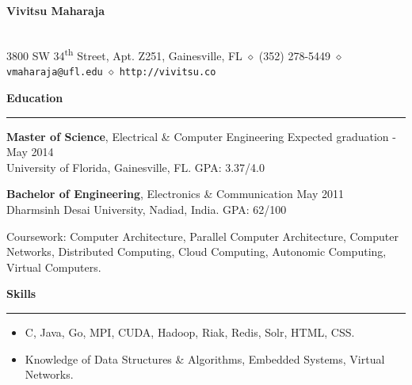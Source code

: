 \documentclass[10pt]{article}
\begin{document}
\begin{center}
\textbf{\Large Vivitsu Maharaja}
\date{}
\thispagestyle{empty}
\smallskip \\
3800 SW 34\textsuperscript{th} Street, Apt. Z251, Gainesville, FL $\diamond$ (352) 278-5449 $\diamond$ \texttt{vmaharaja@ufl.edu} $\diamond$ \texttt{http://vivitsu.co}
\end{center}


\textbf{Education}
\smallskip
\hrule
{\bf Master of Science}, Electrical \& Computer Engineering \hfill Expected graduation - May 2014\\
University of Florida, Gainesville, FL. \hfill GPA: 3.37/4.0

{\bf Bachelor of Engineering}, Electronics \& Communication \hfill May 2011\\
Dharmsinh Desai University, Nadiad, India. \hfill GPA: 62/100

Coursework: Computer Architecture, Parallel Computer Architecture, Computer Networks, Distributed Computing, Cloud Computing, Autonomic Computing, Virtual Computers.

\textbf{Skills}
\smallskip
\hrule
\begin{itemize}
    \item C, Java, Go, MPI, CUDA, Hadoop, Riak, Redis, Solr, HTML, CSS.
    \item Knowledge of Data Structures \& Algorithms, Embedded Systems, Virtual Networks.
\end{itemize} 
\end{document}
